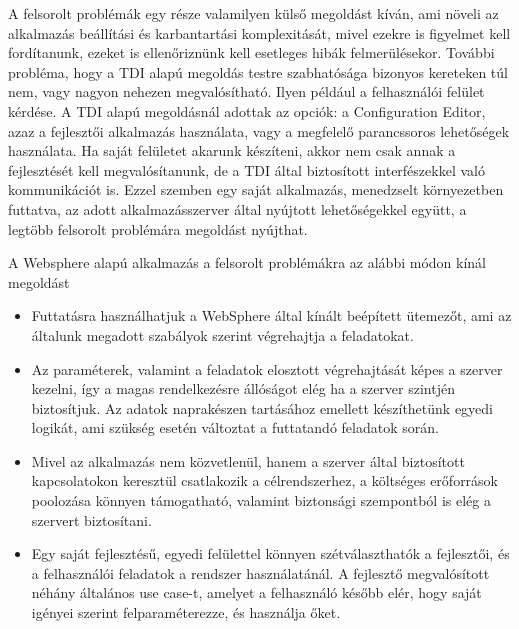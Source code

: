 A felsorolt problémák egy része valamilyen külső megoldást kíván, ami növeli az alkalmazás beállítási és karbantartási komplexitását, mivel ezekre is figyelmet kell fordítanunk, ezeket is ellenőriznünk kell esetleges hibák felmerülésekor. További probléma, hogy a TDI alapú megoldás testre szabhatósága bizonyos kereteken túl nem, vagy nagyon nehezen megvalósítható. Ilyen például a felhasználói felület kérdése. A TDI alapú megoldásnál adottak az opciók: a Configuration Editor, azaz a fejlesztői alkalmazás használata, vagy a megfelelő parancssoros lehetőségek használata. Ha saját felületet akarunk készíteni, akkor nem csak annak a fejlesztését kell megvalósítanunk, de a TDI által biztosított interfészekkel való kommunikációt is. Ezzel szemben egy saját alkalmazás, menedzselt környezetben futtatva, az adott alkalmazásszerver által nyújtott lehetőségekkel együtt, a legtöbb felsorolt problémára megoldást nyújthat. 


A Websphere alapú alkalmazás a felsorolt problémákra az alábbi módon kínál megoldást
\begin{itemize}
	\item Futtatásra használhatjuk a WebSphere által kínált beépített ütemezőt, ami az általunk megadott szabályok szerint végrehajtja a feladatokat.
	
	\item Az paraméterek, valamint a feladatok elosztott végrehajtását képes a szerver kezelni, így a magas rendelkezésre állóságot elég ha a szerver szintjén biztosítjuk. Az adatok naprakészen tartásához emellett készíthetünk egyedi logikát, ami szükség esetén változtat a futtatandó feladatok során.
	
	\item Mivel az alkalmazás nem közvetlenül, hanem a szerver által biztosított kapcsolatokon keresztül csatlakozik a célrendszerhez, a költséges erőforrások poolozása könnyen támogatható, valamint biztonsági szempontból is elég a szervert biztosítani.
	
	\item Egy saját fejlesztésű, egyedi felülettel könnyen szétválaszthatók a fejlesztői, és a felhasználói feladatok a rendszer használatánál. A fejlesztő megvalósított néhány általános use case-t, amelyet a felhasználó később elér, hogy saját igényei szerint felparaméterezze, és használja őket. 
	
\end{itemize}

